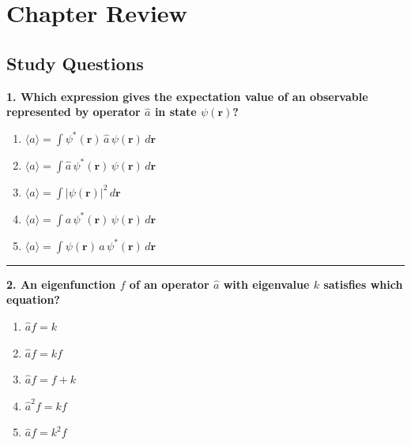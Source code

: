 \documentclass[
  english,
  9pt,
]{extbook}
\providecommand{\tightlist}{%
  \setlength{\itemsep}{0pt}\setlength{\parskip}{0pt}}
\theoremstyle{definition}
\theoremstyle{definition}
\theoremstyle{definition}
\theoremstyle{definition}
\theoremstyle{remark}
\begin{document}
\section{Chapter Review}\label{rev6}

\subsection{Study Questions}\label{quest6}

\textbf{1. Which expression gives the expectation value of an observable represented by operator \(\hat{a}\) in state \(\psi(\mathbf{r})\)?}

\begin{enumerate}
\def\labelenumi{\alph{enumi}.}
\tightlist
\item
  \(\langle a \rangle = \int \psi^*(\mathbf{r})\,\hat{a}\,\psi(\mathbf{r})\,d\mathbf{r}\)\\
\item
  \(\langle a \rangle = \int \hat{a}\,\psi^*(\mathbf{r})\,\psi(\mathbf{r})\,d\mathbf{r}\)\\
\item
  \(\langle a \rangle = \int |\psi(\mathbf{r})|^2\,d\mathbf{r}\)\\
\item
  \(\langle a \rangle = \int a\,\psi^*(\mathbf{r})\,\psi(\mathbf{r})\,d\mathbf{r}\)\\
\item
  \(\langle a \rangle = \int \psi(\mathbf{r})\,\hat{a}\,\psi^*(\mathbf{r})\,d\mathbf{r}\)
\end{enumerate}

\begin{center}\rule{0.5\linewidth}{0.5pt}\end{center}

\textbf{2. An eigenfunction \(f\) of an operator \(\hat{a}\) with eigenvalue \(k\) satisfies which equation?}

\begin{enumerate}
\def\labelenumi{\alph{enumi}.}
\tightlist
\item
  \(\hat{a} f = k\)\\
\item
  \(\hat{a} f = k f\)\\
\item
  \(\hat{a} f = f + k\)\\
\item
  \(\hat{a}^2 f = k f\)\\
\item
  \(\hat{a} f = k^2 f\)
\end{enumerate}
\end{document}
